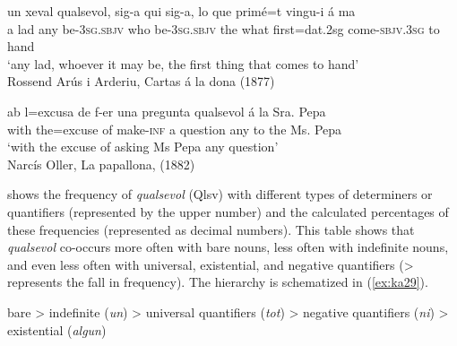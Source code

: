 \documentclass[output=paper,colorlinks,citecolor=brown]{langscibook}
\begin{document}
\ea \label{ex:ka27}
    \gll un xeval qualsevol, sig-a qui sig-a, lo que primé=t vingu-i á ma\\
    a lad any be-3\textsc{sg.sbjv} who be-3\textsc{sg.sbjv} the what first={dat.2sg} come-\textsc{sbjv.3sg} to hand\\
    \glt ‘any lad, whoever it may be, the first thing that comes to hand’\\
    Rossend Arús i Arderiu, Cartas á la dona (1877)
    
    \ex \label{ex:ka28}
    \gll ab l=excusa de f-er una pregunta qualsevol á la Sra. Pepa\\
    with the=excuse of make-\textsc{inf} a question any to the Ms. Pepa\\
    \glt ‘with the excuse of asking Ms Pepa any question’\\
    Narcís Oller, La papallona, (1882)
\z

 shows the frequency of \textit{qualsevol} (Qlsv) with different types of determiners or quantifiers (represented by the upper number) and the calculated percentages of these frequencies (represented as decimal numbers). This table shows that \textit{qualsevol} co-occurs more often with bare nouns, less often with indefinite nouns, and even less often with universal, existential, and negative quantifiers (> represents the fall in frequency). The hierarchy is schematized in (\ref{ex:ka29}).

\ea \label{ex:ka29}
    bare > indefinite (\textit{un}) > universal quantifiers (\textit{tot}) > negative quantifiers (\textit{ni}) > existential (\textit{algun})\\
\z
\end{document}
